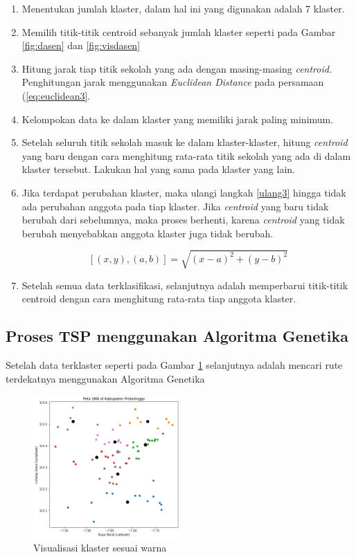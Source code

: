 \begin{enumerate}
	\item Menentukan jumlah klaster, dalam hal ini yang digunakan adalah 7 klaster.
	\item Memilih titik-titik centroid sebanyak jumlah klaster seperti pada Gambar \ref{fig:dasen} dan \ref{fig:visdasen}
	\item \label{ulang3} Hitung jarak tiap titik sekolah yang ada dengan masing-masing \textit{centroid}. Penghitungan jarak menggunakan \textit{Euclidean Distance} pada persamaan (\ref{eq:euclidean3}.
	\item Kelompokan data ke dalam klaster yang memiliki jarak paling minimum.
	\item Setelah seluruh titik sekolah masuk ke dalam klaster-klaster, hitung \textit{centroid} yang baru dengan cara menghitung rata-rata titik sekolah yang ada di dalam klaster tersebut. Lakukan hal yang sama pada klaster yang lain.
	\item Jika terdapat perubahan klaster, maka ulangi langkah \ref{ulang3} hingga tidak ada perubahan anggota pada tiap klaster. Jika \textit{centroid} yang baru tidak berubah dari sebelumnya, maka proses berhenti, karena \textit{centroid} yang tidak berubah menyebabkan anggota klaster juga tidak berubah.
	
	\begin{equation}
	\left[ \left( x,y \right) ,\left( a,b \right)\right]=\sqrt{\left( x-a \right)^{2}+\left( y-b \right)^{2}}
	\label{eq:euclidean3}
	\end{equation}
	
	\item Setelah semua data terklasifikasi, selanjutnya adalah memperbarui titik-titik centroid dengan cara menghitung rata-rata tiap anggota klaster.
\end{enumerate}

\subsection{Proses TSP menggunakan Algoritma Genetika}

Setelah data terklaster seperti pada Gambar \ref{fig:hasilklas} selanjutnya adalah mencari rute terdekatnya menggunakan Algoritma Genetika

\begin{figure}[h!]
	\centering
	\includegraphics[width=0.5\textwidth]{hasil klaster.png}
	\caption{Visualisasi klaster sesuai warna}
	\label{fig:hasilklas}
\end{figure}

